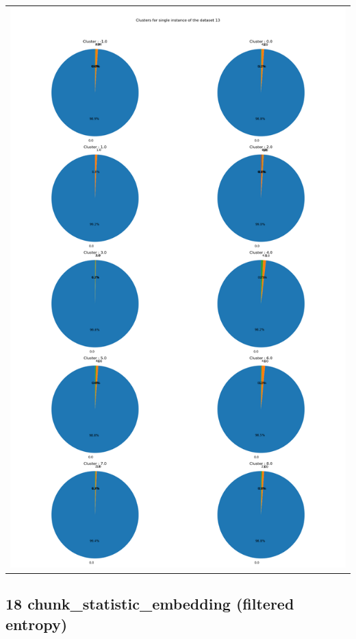 \begin{longtable}{|c|c|c|c|c|}
\multicolumn{5}{|c|}{\includegraphics[width=0.8\linewidth]{img/annexes/13/clustering_pie_charts/single instance.png}} \\
\end{longtable}


\subsection{18 chunk\_statistic\_embedding (filtered entropy)}

